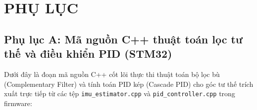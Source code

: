 \section*{PHỤ LỤC}
\thispagestyle{empty}

\subsection*{Phụ lục A: Mã nguồn C++ thuật toán lọc tư thế và điều khiển PID (STM32)}

Dưới đây là đoạn mã nguồn C++ cốt lõi thực thi thuật toán bộ lọc bù (Complementary Filter) và tính toán PID kép (Cascade PID) cho góc tư thế trích xuất trực tiếp từ các tệp \texttt{imu\_estimator.cpp} và \texttt{pid\_controller.cpp} trong firmware:

